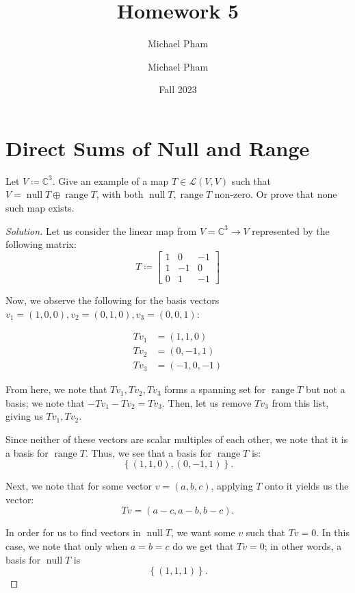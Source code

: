 \documentclass{article}
\title{#1}
\author{Michael Pham}
\date{#2}
\newenvironment{solution}{\begin{proof}[Solution]}{\end{proof}}
\newcommand{\CC}{\mathbb{C}}
\DeclareMathOperator*{\vnull}{\mathrm{null}}
\DeclareMathOperator*{\vrange}{\mathrm{range}}
\newcommand{\mytitle}[2]{%
	\title{#1}
	\author{Michael Pham}
	\date{#2}
	\maketitle
	\newpage
	\tableofcontents
	\newpage
}
\begin{document}
	\mytitle{Homework 5}{Fall 2023}
	
	\section{Direct Sums of Null and Range}
	\begin{hw}
		Let $V \coloneq \CC^{3}$. Give an example of a map $T \in \mathcal L(V,V)$ such that $V = \vnull T \oplus \vrange T$, with both $\vnull T, \vrange T$ non-zero. Or prove that none such map exists.
	\end{hw}
	\begin{solution}
		Let us consider the linear map from $V = \CC^{3} \rightarrow V$ represented by the following matrix:
		\begin{equation*} T \coloneq
			\begin{bmatrix}
				1 & 0 & -1 \\
				1 & -1 & 0 \\
				0 & 1 & -1
			\end{bmatrix}
		\end{equation*}
	
		Now, we observe the following for the basis vectors $v_{1} = (1,0,0), v_{2} = (0,1,0), v_{3} = (0,0,1)$:
		
		\begin{align*}
			Tv_{1} &= (1,1,0) \\
			Tv_{2} &= (0,-1,1) \\
			Tv_{3} &= (-1, 0, -1)
		\end{align*}
	
		From here, we note that $Tv_{1}, Tv_{2}, Tv_{3}$ forms a spanning set for $\vrange T$ but not a basis; we note that $-Tv_{1} - Tv_{2} = Tv_{3}$. Then, let us remove $Tv_{3}$ from this list, giving us $Tv_{1}, Tv_{2}$.
		
		Since neither of these vectors are scalar multiples of each other, we note that it is a basis for $\vrange T$. Thus, we see that a basis for $\vrange T$ is:
		\begin{equation*}
			\left\{  (1,1,0), (0,-1,1) \right\}.
		\end{equation*}
		
		Next, we note that for some vector $v = (a,b,c)$, applying $T$ onto it yields us the vector:
		\begin{equation*}
			Tv = (a-c, a-b, b-c).
		\end{equation*}
	
		In order for us to find vectors in $\vnull T$, we want some $v$ such that $Tv = 0$. In this case, we note that only when $a = b = c$ do we get that $Tv = 0$; in other words, a basis for $\vnull T$ is
		\begin{equation*}
			\left\{  (1,1,1) \right\}.
		\end{equation*}
	

\end{solution}
\end{document}
